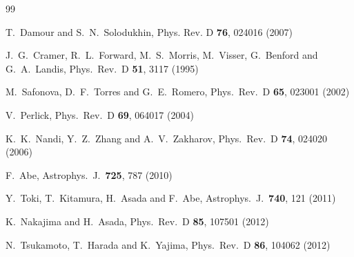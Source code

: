 \documentclass[11pt,a4paper]{article}
\begin{document}
\clearpage


\begin{thebibliography}{99}


T.~Damour and S.~N.~Solodukhin,
Phys. Rev. D \textbf{76}, 024016 (2007)

  J.~G.~Cramer, R.~L.~Forward, M.~S.~Morris, M.~Visser, G.~Benford and G.~A.~Landis,
  Phys.\ Rev.\ D {\bf 51}, 3117 (1995)

  M.~Safonova, D.~F.~Torres and G.~E.~Romero,
  Phys.\ Rev.\ D {\bf 65}, 023001 (2002)

  V.~Perlick,
  Phys.\ Rev.\ D {\bf 69}, 064017 (2004)

  K.~K.~Nandi, Y.~Z.~Zhang and A.~V.~Zakharov,
  Phys.\ Rev.\ D {\bf 74}, 024020 (2006)

  F.~Abe,
  Astrophys.\ J.\  {\bf 725}, 787 (2010)

  Y.~Toki, T.~Kitamura, H.~Asada and F.~Abe,
  Astrophys.\ J.\  {\bf 740}, 121 (2011)

  K.~Nakajima and H.~Asada,
  Phys.\ Rev.\ D {\bf 85}, 107501 (2012)

  N.~Tsukamoto, T.~Harada and K.~Yajima,
  Phys.\ Rev.\ D {\bf 86}, 104062 (2012)


\end{thebibliography}
\end{document}
